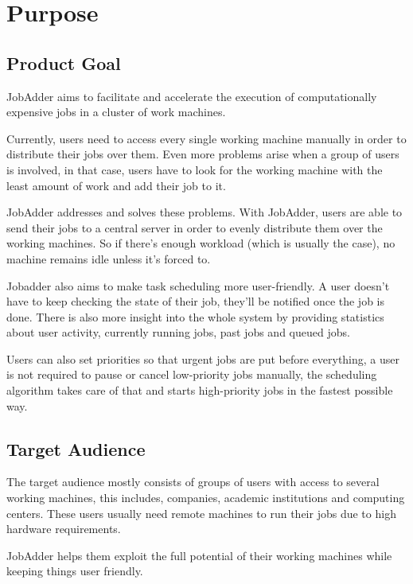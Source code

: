 \section{Purpose}
  \subsection{Product Goal}
    JobAdder aims to facilitate and accelerate the execution of computationally expensive jobs in a cluster of work
    machines.

    Currently, users need to access every single working machine manually in order to distribute their jobs over them.
    Even more problems arise when a group of users is involved, in that case, users have to look for the working machine
    with the least amount of work and add their job to it.
    
    JobAdder addresses and solves these problems. With JobAdder, users are able to send their jobs to a central 
    server in order to evenly distribute them over the working machines. So if there's enough workload (which is usually
    the case), no machine remains idle unless it's forced to.

    Jobadder also aims to make task scheduling more user-friendly. A user doesn't have to keep checking the state of
    their job, they'll be notified once the job is done. There is also more insight into the whole system by 
    providing statistics about user activity, currently running jobs, past jobs and queued jobs.

    Users can also set priorities so that urgent jobs are put before everything, a user is not required to pause or 
    cancel low-priority jobs manually, the scheduling algorithm takes care of that and starts high-priority jobs in the
    fastest possible way.

  \subsection{Target Audience}
    The target audience mostly consists of groups of users with access to several working machines, this includes,
    companies, academic institutions and computing centers. These users usually need remote machines to run their jobs
    due to high hardware requirements.
    
    JobAdder helps them exploit the full potential of their working machines while keeping things user friendly.